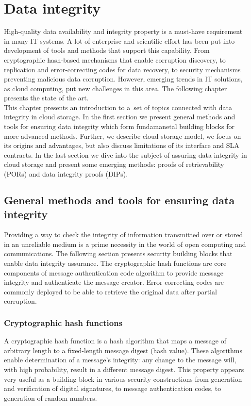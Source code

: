 \chapter{Data integrity}
\label{cha:state_of_the_art}
High-quality data availability and integrity property is a must-have
requirement in many IT systems. A lot of enterprise and scientific effort
has been put into development of tools and methods that support this capability.
From cryptographic hash-based mechanisms that enable corruption discovery, to
replication and error-correcting codes for data recovery, to security
mechanisms preventing malicious data corruption. However, emerging trends in IT
solutions, as cloud computing, put new challenges in this area. The following
chapter presents the state of the art.\\

This chapter presents an introduction to a~set of topics connected with 
data integrity in cloud storage. In the first section we present
general methods and tools for ensuring data integrity which form
fundamanetal building blocks for more advanced methods. Further, we
describe cloud storage model, we focus on its origins and advantages, but
also discuss limitations of its interface and SLA contracts. In the last
section we dive into the subject of assuring data integrity in cloud
storage and present some emerging methods: proofs of retrievability (PORs)
and data integrity proofs (DIPs).



	\section{General methods and tools for ensuring data integrity}
	\label{classic-integrity-methods}
Providing a way to check the integrity of information transmitted over or
stored in an unreliable medium is a prime necessity in the world of open
computing and communications. The following section presents security building
blocks that enable data integrity assurance. The cryptographic hash functions
are core components of message authentication code algorithm to provide message
integrity and authenticate the message creator. Error correcting codes are 
commonly deployed to be able to retrieve the original data after partial
corruption.
 
		\subsection{Cryptographic hash functions}
A cryptographic hash function is a hash algorithm that maps a message of
arbitrary length to a fixed-length message digest (hash value). These
algorithms enable determination of a message's integrity: any change to the
message will, with high probability, result in a different message digest.
This property appears very useful as a building block in various security
constructions from generation and verification of digital signatures, to
message authentication codes, to generation of random numbers.\\ 

